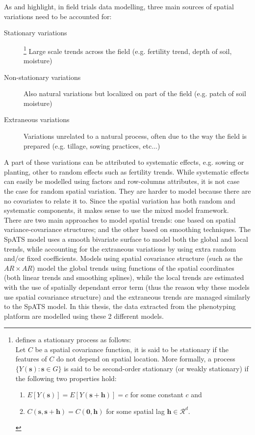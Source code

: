 As \textcite{wilkinson_nearest_1983} and \textcite{gilmour_accounting_1997} highlight, in field trials data modelling, three main sources of spatial variations need to be accounted for:
\begin{description}
    \item[Stationary variations] 
    	\footnote{\textcite{risser_nonstationary_2016} defines a stationary process as follows:\\
	    Let $C$ be a spatial covariance function, it is said to be stationary if the features of $C$ do not depend on spatial 
	    location. More formally, a process $\{Y(\mathbf{s}) : \mathbf{s} \in G\}$ is said to be second-order stationary (or 
	    weakly 
	    stationary) if the following two properties hold:
		    \begin{enumerate}
		        \item $E[Y(\mathbf{s})]=E[Y(\mathbf{s}+\mathbf{h})]=c$ for some constant $c$ and 
		        \item $C(\mathbf{s}, \mathbf{s}+\mathbf{h})=C(\mathbf{0}, \mathbf{h})$
		        for some spatial lag $\mathbf{h} \in \mathcal{R}^{d}$.
		    \end{enumerate}
	    }
    Large scale trends across the field (e.g. fertility trend, depth of soil, moisture)
    \item[Non-stationary variations] Also natural variations but localized on part of the field (e.g. patch of soil moisture)
    \item[Extraneous variations] Variations unrelated to a natural process, often due to the way the field is prepared (e.g. 
    tillage, sowing practices, etc$\ldots$)
\end{description}
A part of these variations can be attributed to systematic effects, e.g. sowing or planting, other to random effects such as fertility trends. While systematic effects can easily be modelled using factors and row-columns attributes, it is not case the case for random spatial variation. They are harder to model because there are no covariates to relate it to. Since the spatial variation has both random and systematic components, it makes sense to use the mixed model framework.\\
There are two main approaches to model spatial trends: one based on spatial variance-covariance structures; and the other based on smoothing techniques. The SpATS model uses a smooth bivariate surface to model both the global and local trends, while accounting for the extraneous variations by using extra random and/or fixed coefficients. Models using spatial covariance structure (such as the $AR\times AR$) model the global trends using functions of the spatial coordinates (both linear trends and smoothing splines), while the local trends are estimated with the use of spatially dependant error term (thus the reason why these models use spatial covariance structure) and the extraneous trends are managed similarly to the SpATS model. In this thesis, the data extracted from the phenotyping platform are modelled using these 2 different models.

